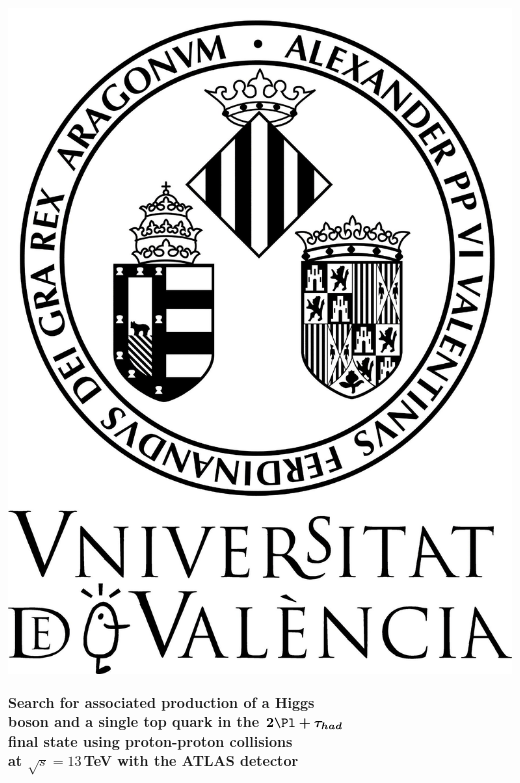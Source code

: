 

\setlength{\unitlength}{0.5cm} %
\thispagestyle{empty}
\begin{center}

\begin{center}
\includegraphics[scale=0.07]{Figures/0-Logos/Escudo03.jpg}
\end{center}

\vspace{1cm}


{\Large \bf{Search for associated production of a Higgs}} \\[2ex]
{\Large \bf{boson and a single top quark in the $\boldsymbol{2\Pl +\tau_{had}}$}} \\[2ex]
{\Large \bf{final state using proton-proton collisions }} \\[2ex]
{\Large \bf{at $\sqrt{s}=13\,$TeV with the ATLAS detector}} \\[2ex]




\end{center}
